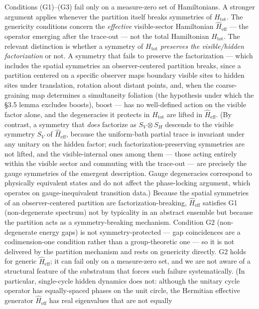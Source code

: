 \documentclass[
]{article}
\begin{document}
Conditions (G1)--(G3) fail only on a measure-zero set of Hamiltonians. A
stronger argument applies whenever the partition itself breaks
symmetries of \(H_{\text{tot}}\). The genericity conditions concern the
\emph{effective} visible-sector Hamiltonian \(\hat{H}_{\text{eff}}\) ---
the operator emerging after the trace-out --- not the total Hamiltonian
\(H_{\text{tot}}\). The relevant distinction is whether a symmetry of
\(H_{\text{tot}}\) \emph{preserves the visible/hidden factorization} or
not. A symmetry that fails to preserve the factorization --- which
includes the spatial symmetries an observer-centered partition breaks,
since a partition centered on a specific observer maps boundary visible
sites to hidden sites under translation, rotation about distant points,
and, when the coarse-graining map determines a simultaneity foliation
(the hypothesis under which the §3.5 lemma excludes boosts), boost ---
has no well-defined action on the visible factor alone, and the
degeneracies it protects in \(H_{\text{tot}}\) are lifted in
\(\hat{H}_{\text{eff}}\). (By contrast, a symmetry that \emph{does}
factorize as \(S_V\otimes S_H\) descends to the visible symmetry \(S_V\)
of \(\hat{H}_{\text{eff}}\), because the uniform-bath partial trace is
invariant under any unitary on the hidden factor; such
factorization-preserving symmetries are not lifted, and the
visible-internal ones among them --- those acting entirely within the
visible sector and commuting with the trace-out --- are precisely the
gauge symmetries of the emergent description. Gauge degeneracies
correspond to physically equivalent states and do not affect the
phase-locking argument, which operates on gauge-inequivalent transition
data.) Because the spatial symmetries of an observer-centered partition
are factorization-breaking, \(\hat{H}_{\text{eff}}\) satisfies G1
(non-degenerate spectrum) not by typicality in an abstract ensemble but
because the partition acts as a symmetry-breaking mechanism. Condition
G2 (non-degenerate energy gaps) is not symmetry-protected --- gap
coincidences are a codimension-one condition rather than a
group-theoretic one --- so it is not delivered by the partition
mechanism and rests on genericity directly. G2 holds for generic
\(\hat{H}_{\text{eff}}\); it can fail only on a measure-zero set, and we
are not aware of a structural feature of the substratum that forces such
failure systematically. (In particular, single-cycle hidden dynamics
does not: although the unitary cycle operator has equally-spaced phases
on the unit circle, the Hermitian effective generator
\(\hat{H}_{\text{eff}}\) has real eigenvalues that are not equally
\end{document}
